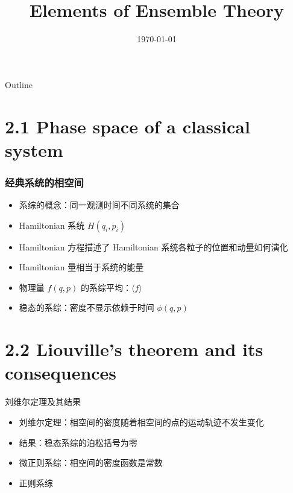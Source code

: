 \documentclass{ctexbeamer}
\title{Elements of Ensemble Theory}
\date{\today}
\begin{document}
\begin{frame}
	\titlepage
\end{frame}
\begin{frame}{Outline}
    \tableofcontents
\end{frame}
\section{2.1 Phase space of a classical system}

\begin{frame}
\frametitle{经典系统的相空间}
\begin{itemize}
    \item 系综的概念：同一观测时间不同系统的集合
    \item Hamiltonian 系统 $H(q_i,p_i)$
    \item Hamiltonian 方程描述了 Hamiltonian 系统各粒子的位置和动量如何演化
    \item Hamiltonian 量相当于系统的能量
    \item 物理量 $f(q, p)$ 的系综平均：$\langle f \rangle$
    \item 稳态的系综：密度不显示依赖于时间 $\phi(q, p)$
\end{itemize}

\end{frame}
\section{2.2 Liouville's theorem and its consequences}
\begin{frame}{刘维尔定理及其结果}
    \begin{itemize}
        \item 刘维尔定理：相空间的密度随着相空间的点的运动轨迹不发生变化
        \item 结果：稳态系综的泊松括号为零
        \item 微正则系综：相空间的密度函数是常数
        \item 正则系综
    \end{itemize}
\end{frame}
\end{document}

